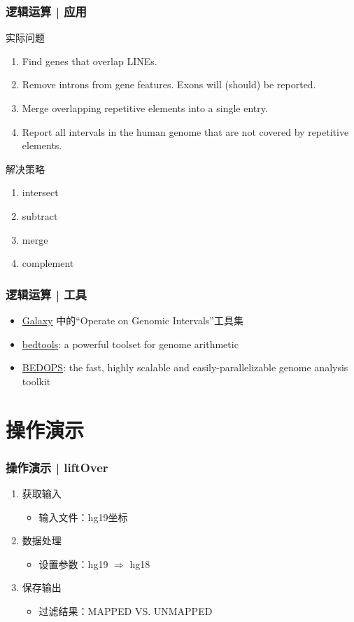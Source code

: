 \documentclass[table]{beamer}
\begin{document}
\begin{frame}
  \frametitle{逻辑运算 | 应用}
  \begin{block}{实际问题}
  \begin{enumerate}
    \item Find genes that overlap LINEs.
    \item Remove introns from gene features. Exons will (should) be reported.
    \item Merge overlapping repetitive elements into a single entry.
    \item Report all intervals in the human genome that are not covered by repetitive elements.
  \end{enumerate}
\end{block}
  \pause
  \begin{block}{解决策略}
  \begin{enumerate}
    \item intersect
    \item subtract
    \item merge
    \item complement
  \end{enumerate}
\end{block}
\end{frame}

\begin{frame}
  \frametitle{逻辑运算 | 工具}
  \begin{itemize}
    \item \href{https://usegalaxy.org/}{Galaxy} 中的“Operate on Genomic Intervals”工具集
    \item \href{http://bedtools.readthedocs.org/en/latest/}{bedtools}: a powerful toolset for genome arithmetic
    \item \href{https://bedops.readthedocs.org/en/latest/}{BEDOPS}: the fast, highly scalable and easily-parallelizable genome analysis toolkit
  \end{itemize}
\end{frame}

\section{操作演示}
\begin{frame}
  \frametitle{操作演示 | liftOver}
  \begin{enumerate}
    \item 获取输入
      \begin{itemize}
        \item 输入文件：hg19坐标
      \end{itemize}
    \item 数据处理
      \begin{itemize}
        \item 设置参数：hg19 $\Rightarrow$ hg18
      \end{itemize}
    \item 保存输出
      \begin{itemize}
        \item 过滤结果：MAPPED VS. UNMAPPED
      \end{itemize}
  \end{enumerate}
\end{frame}
\end{document}
